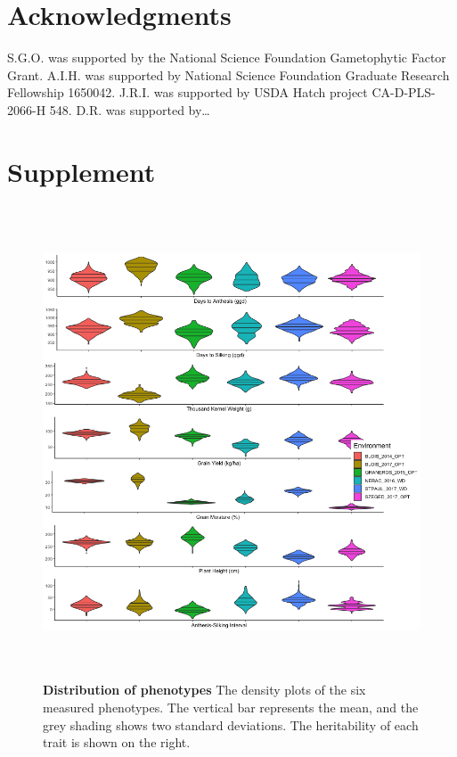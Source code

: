 \documentclass[article,9pt,twocolumn,twoside]{rilabRxiv}
\newcommand{\jri}[1]{{\small \textcolor{red}{#1}}}
\newcommand{\beginsupplement}{%
        \setcounter{table}{0}
        \renewcommand{\thetable}{S\arabic{table}}%
        \setcounter{figure}{0}
        \renewcommand{\thefigure}{S\arabic{figure}}%
     }
\begin{document}


\section{Acknowledgments}
S.G.O. was supported by the National Science Foundation Gametophytic Factor Grant. A.I.H. was supported by National Science Foundation Graduate Research Fellowship 1650042. J.R.I. was supported by USDA Hatch project CA-D-PLS-2066-H 548. D.R. was supported by…



\onecolumn
\beginsupplement
\section*{Supplement}
\begin{figure}[hb]
\centering
\includegraphics[width=\linewidth,height=14cm]{figures/Methods_Fig2_violinplot.png}
\caption{\textbf{Distribution of phenotypes} The density plots of the six measured phenotypes. The vertical bar represents the mean, and the grey shading shows two standard deviations. The heritability of each trait is shown on the right.}
\label{fig:supfigure1}
\end{figure}
\end{document}
